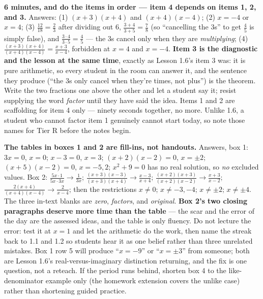 \documentclass[10pt]{article}
\begin{document}
\begin{teachernote}[Warm-Up]
    \textbf{6 minutes, and do the items in order --- item 4 depends on items 1, 2, and 3.} Answers:
    (1) $(x+3)(x+4)$ and $(x+4)(x-4)$; (2) $x=-4$ or $x=4$; (3) $\tfrac{12}{18}=\tfrac23$ after
    dividing out $6$, $\tfrac{3+4}{3+5}=\tfrac78$ (so ``cancelling the $3$s'' to get $\tfrac45$ is
    simply false), and $\tfrac{3\cdot4}{3\cdot5}=\tfrac45$ --- the $3$s cancel only when they are
    \emph{multiplying}; (4) $\tfrac{(x+3)(x+4)}{(x+4)(x-4)}=\tfrac{x+3}{x-4}$, forbidden at $x=4$
    and $x=-4$. \textbf{Item 3 is the diagnostic and the lesson at the same time}, exactly as
    Lesson 1.6's item 3 was: it is pure arithmetic, so every student in the room can answer it, and
    the sentence they produce (``the $3$s only cancel when they're times, not plus'') is the
    theorem. Write the two fractions one above the other and let a student say it; resist supplying
    the word \emph{factor} until they have said the idea. Items 1 and 2 are scaffolding for item 4
    only --- ninety seconds together, no more. Unlike 1.6, a student who cannot factor item 1
    genuinely cannot start today, so note those names for Tier R before the notes begin.
\end{teachernote}

\boxguard[18]
\begin{teachernote}
    \textbf{The tables in boxes 1 and 2 are fill-ins, not handouts.} Answers, box 1: $3x=0$,
    $x=0$; $x-3=0$, $x=3$; $(x+2)(x-2)=0$, $x=\pm2$; $(x+5)(x-2)=0$, $x=-5,2$; $x^2+9=0$ has no
    real solution, so \emph{no} excluded values. Box 2: $\tfrac{5x\cdot1}{5x\cdot3x} \to
    \tfrac1{3x}$; $\tfrac{(x+3)(x-3)}{(x+3)(x+4)} \to \tfrac{x-3}{x+4}$;
    $\tfrac{(x+2)(x+3)}{(x+2)(x-2)} \to \tfrac{x+3}{x-2}$; $\tfrac{2(x+4)}{(x+4)(x-4)} \to
    \tfrac2{x-4}$; then the restrictions $x \ne 0$; $x \ne -3,-4$; $x \ne \pm2$; $x \ne \pm4$. The
    three in-text blanks are \emph{zero}, \emph{factors}, and \emph{original}.
    \textbf{Box 2's two closing paragraphs deserve more time than the table} --- the scar and the
    error of the day are the assessed ideas, and the table is only fluency. Do not lecture the
    error: test it at $x=1$ and let the arithmetic do the work, then name the streak back to 1.1 and
    1.2 so students hear it as one belief rather than three unrelated mistakes. Box 1 row 5 will
    produce ``$x=-9$'' or ``$x=\pm3$'' from someone; both are Lesson 1.6's real-versus-imaginary
    distinction returning, and the fix is one question, not a reteach. If the period runs behind,
    shorten box 4 to the like-denominator example only (the homework extension covers the unlike
    case) rather than shortening guided practice.
\end{teachernote}
\end{document}
